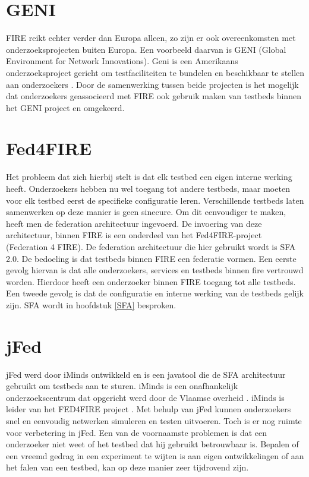 \section{GENI}
\npar
FIRE reikt echter verder dan Europa alleen, zo zijn er ook overeenkomsten met onderzoeksprojecten buiten Europa. Een voorbeeld daarvan is GENI (Global Environment for Network Innovations). Geni is een Amerikaans onderzoeksproject gericht om testfaciliteiten te bundelen en beschikbaar te stellen aan onderzoekers \citep{geni-what-is}. Door de samenwerking tussen beide projecten is het mogelijk dat onderzoekers geassocieerd met FIRE ook gebruik maken van testbeds binnen het GENI project en omgekeerd.

\section{Fed4FIRE}
\npar
Het probleem dat zich hierbij stelt is dat elk testbed een eigen interne werking heeft. Onderzoekers hebben nu wel toegang tot andere testbeds, maar moeten voor elk testbed eerst de specifieke configuratie leren. Verschillende testbeds laten samenwerken op deze manier is geen sinecure. Om dit eenvoudiger te maken, heeft men de federation architectuur ingevoerd. 
\npar
De invoering van deze architectuur, binnen FIRE is een onderdeel van het Fed4FIRE-project (Federation 4 FIRE). De federation architectuur die hier gebruikt wordt is SFA 2.0. De bedoeling is dat testbeds binnen FIRE een federatie vormen. Een eerste gevolg hiervan is dat alle onderzoekers, services en testbeds binnen fire vertrouwd worden. Hierdoor heeft een onderzoeker binnen FIRE toegang tot alle testbeds. Een tweede gevolg is dat de configuratie en interne werking van de testbeds gelijk zijn. SFA wordt in hoofdstuk \ref{SFA} besproken.

\section{jFed}
\npar
jFed werd door iMinds ontwikkeld \citep{iminds-jFed} en is een javatool die de SFA architectuur gebruikt om testbeds aan te sturen. iMinds is een onafhankelijk onderzoekscentrum dat opgericht werd door de Vlaamse overheid \citep{iMinds-what-is}. iMinds is leider van het FED4FIRE project \citep{iminds-FED4FIRE}.
\npar
Met behulp van jFed kunnen onderzoekers snel en eenvoudig netwerken simuleren en testen uitvoeren. Toch is er nog ruimte voor verbetering in jFed. Een van de voornaamste problemen is dat een onderzoeker niet weet of het testbed dat hij gebruikt betrouwbaar is. Bepalen of een vreemd gedrag in een experiment te wijten is aan eigen ontwikkelingen of aan het falen van een testbed, kan op deze manier zeer tijdrovend zijn.

